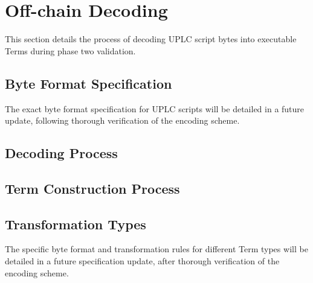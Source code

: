 \documentclass[../midgard.tex]{subfiles}
\begin{document}
\section{Off-chain Decoding}
\label{s:phase-two-decoding-off-chain}

This section details the process of decoding UPLC script bytes into executable Terms during phase two validation.

\subsection{Byte Format Specification}

The exact byte format specification for UPLC scripts will be detailed in a future update, following thorough verification of the encoding scheme.

\subsection{Decoding Process}

\subsection{Term Construction Process}

\subsection{Transformation Types}

The specific byte format and transformation rules for different Term types will be detailed in a future specification update, after thorough verification of the encoding scheme.
\end{document}
